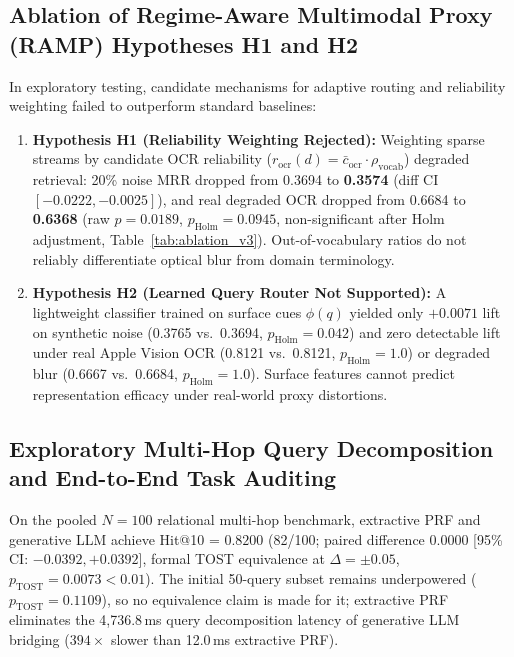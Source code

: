 \subsection{Ablation of Regime-Aware Multimodal Proxy (RAMP) Hypotheses H1 and H2}
In exploratory testing, candidate mechanisms for adaptive routing and reliability weighting failed to outperform standard baselines:
\begin{enumerate}
    \setlength{\itemsep}{0pt}
    \setlength{\parskip}{0pt}
    \setlength{\parsep}{0pt}
    \setlength{\topsep}{1pt}
    \item \textbf{Hypothesis H1 (Reliability Weighting Rejected):} Weighting sparse streams by candidate OCR reliability ($r_{\text{ocr}}(d) = \bar{c}_{\text{ocr}} \cdot \rho_{\text{vocab}}$) degraded retrieval: 20\% noise MRR dropped from 0.3694 to \textbf{0.3574} (diff CI $[-0.0222, -0.0025]$), and real degraded OCR dropped from 0.6684 to \textbf{0.6368} (raw $p = 0.0189$, $p_{\text{Holm}} = 0.0945$, non-significant after Holm adjustment, Table~\ref{tab:ablation_v3}). Out-of-vocabulary ratios do not reliably differentiate optical blur from domain terminology.
    \item \textbf{Hypothesis H2 (Learned Query Router Not Supported):} A lightweight classifier trained on surface cues $\phi(q)$ yielded only $+0.0071$ lift on synthetic noise (0.3765 vs.\ 0.3694, $p_{\text{Holm}}=0.042$) and zero detectable lift under real Apple Vision OCR (0.8121 vs.\ 0.8121, $p_{\text{Holm}}=1.0$) or degraded blur (0.6667 vs.\ 0.6684, $p_{\text{Holm}}=1.0$). Surface features cannot predict representation efficacy under real-world proxy distortions.
\end{enumerate}

\subsection{Exploratory Multi-Hop Query Decomposition and End-to-End Task Auditing}
\label{sec:multihop_reasoning}
On the pooled $N=100$ relational multi-hop benchmark, extractive PRF and generative LLM achieve Hit@10 = $0.8200$ (82/100; paired difference $0.0000$ [95\% CI: $-0.0392, +0.0392$], formal TOST equivalence at $\Delta = \pm 0.05$, $p_{\text{TOST}} = 0.0073 < 0.01$). The initial 50-query subset remains underpowered ($p_{\text{TOST}}=0.1109$), so no equivalence claim is made for it; extractive PRF eliminates the 4,736.8\,ms query decomposition latency of generative LLM bridging ($394\times$ slower than 12.0\,ms extractive PRF).

